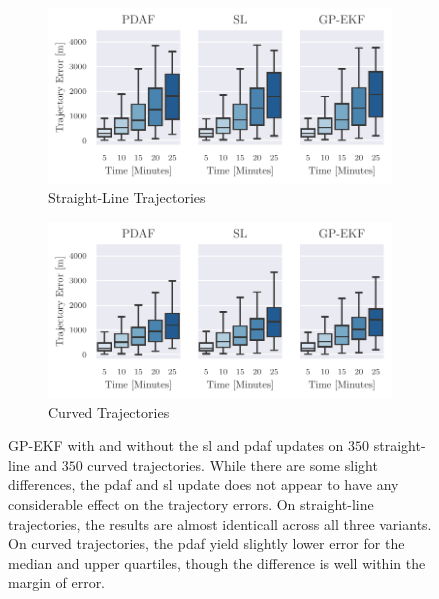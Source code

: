 \begin{figure}[h]
    \centering
    \begin{subfigure}{1\textwidth}
        \includegraphics[width=\textwidth]{figures/straight_line_stats/gp_vs_update.pdf}
        \caption{Straight-Line Trajectories}
    \end{subfigure}
    \begin{subfigure}{1\textwidth}
        \includegraphics[width=\textwidth]{figures/curved_line_stats/gp_vs_update.pdf}
        \caption{Curved Trajectories}
    \end{subfigure}
    \caption{GP-EKF with and without the \acrshort{sl} and \acrshort{pdaf} updates on $350$ straight-line and $350$ curved trajectories. While there are some slight differences, the \acrshort{pdaf} and \acrshort{sl} update does not appear to have any considerable effect on the trajectory errors. On straight-line trajectories, the results are almost identicall across all three variants. On curved trajectories, the \acrshort{pdaf} yield slightly lower error for the median and upper quartiles, though the difference is well within the margin of error.}
    \label{fig:stats_gp_ekf_with_or_without_update}
\end{figure}

